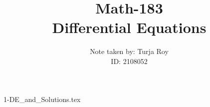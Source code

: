 \documentclass[12pt]{article}
\title{
    \textbf{Math-183} \\
    \textbf{Differential Equations}
}
\author{
    Note taken by: Turja Roy \\
    ID: 2108052
}
\date{}
\begin{document}
\maketitle

\tableofcontents
\pagebreak


{1-DE_and_Solutions.tex}
\pagebreak
\end{document}

